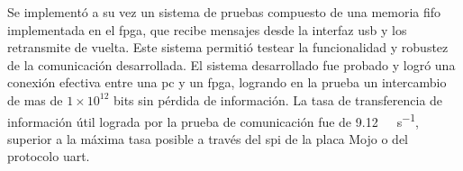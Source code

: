 Se implementó a su vez un sistema de pruebas compuesto de una memoria \acrshort{fifo} implementada en el \acrshort{fpga}, que recibe mensajes desde la interfaz \acrshort{usb} y los retransmite de vuelta. Este sistema permitió testear la funcionalidad y robustez de la comunicación desarrollada.
El sistema desarrollado fue probado y logró una conexión efectiva entre una \acrshort{pc} y un \acrshort{fpga}, logrando en la prueba un intercambio de mas de $1 \times 10^{12}$ bits sin pérdida de información. La tasa de transferencia de información útil lograda por la prueba de comunicación fue de \SI{9,12}{\mega\bit\per\second}, superior a la máxima tasa posible a través del \acrshort{spi} de la placa Mojo o del protocolo \acrshort{uart}.


%
%
%
